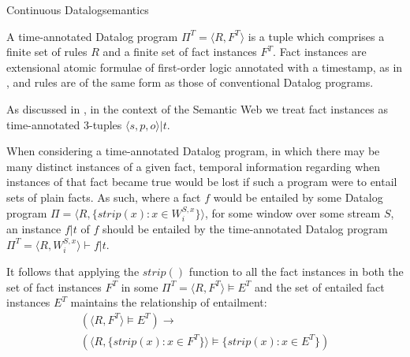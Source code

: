 \begin{nestedsection}{Continuous Datalog}{semantics}
\begin{definition}
A time-annotated Datalog program $\Pi^T = \langle R, F^T\rangle$ is a tuple
which comprises a finite set of rules $R$ and a finite set of fact instances
$F^T$. Fact instances are extensional atomic formulae of first-order logic
annotated with a timestamp, as in ,
and rules are of the same form as those of conventional Datalog programs.

As discussed in ,
in the context of the Semantic Web we treat fact instances as time-annotated
3-tuples ${\langle s, p, o \rangle | t}$.
\end{definition}

When considering a time-annotated Datalog program, in which there may be
many distinct instances of a given fact, temporal information regarding when
instances of that fact became true would be lost if such a program were to entail
sets of plain facts. As such, where a fact $f$ would be entailed by some Datalog
program ${\Pi = \langle R, \{ strip(x) : x \in W^{S,x}_i \} \rangle}$,
for some window over some stream $S$, an instance ${f | t}$ of $f$ should be
entailed by the time-annotated Datalog program
${\Pi^T = \langle R, W^{S,x}_i \rangle \vdash f | t}$.

It follows that applying the ${strip()}$ function to all the fact instances in
both the set of fact instances $F^T$ in some ${\Pi^T = \langle R, F^T \rangle \vDash E^T}$
and the set of entailed fact instances $E^T$ maintains the relationship of entailment:
\begin{multline*}
	\left( \langle R, F^T \rangle \vDash E^T \right) \rightarrow \\
		\left( \langle R, \{ strip(x) : x \in F^T \} \rangle \vDash \{ strip(x) : x \in E^T \} \right)
\end{multline*}


\end{nestedsection}
